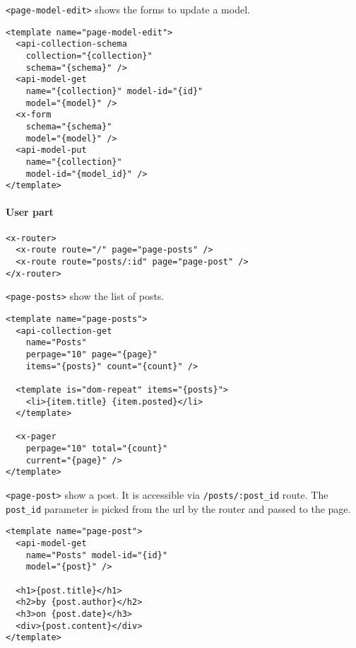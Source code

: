 \vspace{0.2cm}

\texttt{<page-model-edit>} shows the forms to update a model.

\begin{lstlisting}[language=HTML5]
<template name="page-model-edit">
  <api-collection-schema
    collection="{collection}"
    schema="{schema}" />
  <api-model-get 
    name="{collection}" model-id="{id}"
    model="{model}" />
  <x-form 
    schema="{schema}" 
    model="{model}" />
  <api-model-put 
    name="{collection}"
    model-id="{model_id}" />
</template>
\end{lstlisting}

\paragraph{User part}

\begin{lstlisting}[language=HTML5]
<x-router>
  <x-route route="/" page="page-posts" />
  <x-route route="posts/:id" page="page-post" />
</x-router>
\end{lstlisting}

\texttt{<page-posts>} show the list of posts.

\begin{lstlisting}[language=HTML5]
<template name="page-posts">
  <api-collection-get 
    name="Posts"
    perpage="10" page="{page}" 
    items="{posts}" count="{count}" />

  <template is="dom-repeat" items="{posts}">
    <li>{item.title} {item.posted}</li>
  </template>

  <x-pager 
    perpage="10" total="{count}" 
    current="{page}" />
</template>
\end{lstlisting}

\texttt{<page-post>} show a post. 
It is accessible via \texttt{/posts/:post\_id} route.
The \texttt{post\_id} parameter is picked from the url by the router and passed to the page.

\begin{lstlisting}[language=HTML5]
<template name="page-post">
  <api-model-get 
    name="Posts" model-id="{id}" 
    model="{post}" />

  <h1>{post.title}</h1>
  <h2>by {post.author}</h2>
  <h3>on {post.date}</h3>
  <div>{post.content}</div>
</template>
\end{lstlisting}

